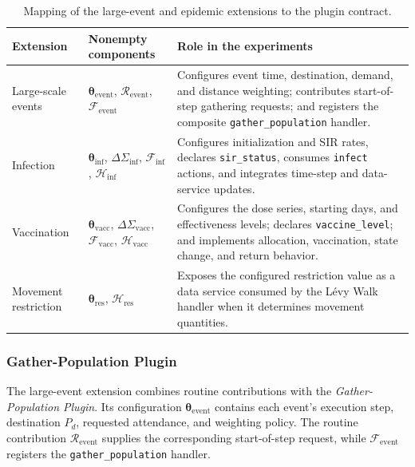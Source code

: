 \begin{table}[ht]
\centering
\footnotesize
\setlength{\tabcolsep}{4pt}
\caption{Mapping of the large-event and epidemic extensions to the plugin contract.}
\label{tbl:large_scale_epidemic_plugin_contract}
\begin{tabularx}{\linewidth}{@{}p{2.5cm}p{4.0cm}X@{}}
\toprule
\textbf{Extension} & \textbf{Nonempty components} & \textbf{Role in the experiments} \\
\midrule
Large-scale events
& $\bm{\theta}_{\mathrm{event}}$, $\mathcal{R}_{\mathrm{event}}$, $\mathcal{F}_{\mathrm{event}}$
& Configures event time, destination, demand, and distance weighting; contributes start-of-step gathering requests; and registers the composite \texttt{gather\_population} handler. \\
Infection
& $\bm{\theta}_{\mathrm{inf}}$, $\Delta\Sigma_{\mathrm{inf}}$, $\mathcal{F}_{\mathrm{inf}}$, $\mathcal{H}_{\mathrm{inf}}$
& Configures initialization and SIR rates, declares \texttt{sir\_status}, consumes \texttt{infect} actions, and integrates time-step and data-service updates. \\
Vaccination
& $\bm{\theta}_{\mathrm{vacc}}$, $\Delta\Sigma_{\mathrm{vacc}}$, $\mathcal{F}_{\mathrm{vacc}}$, $\mathcal{H}_{\mathrm{vacc}}$
& Configures the dose series, starting days, and effectiveness levels; declares \texttt{vaccine\_level}; and implements allocation, vaccination, state change, and return behavior. \\
Movement restriction
& $\bm{\theta}_{\mathrm{res}}$, $\mathcal{H}_{\mathrm{res}}$
& Exposes the configured restriction value as a data service consumed by the L\'evy Walk handler when it determines movement quantities. \\
\bottomrule
\end{tabularx}
\end{table}
\FloatBarrier


\subsubsection{Gather-Population Plugin}

The large-event extension combines routine contributions with the \textit{Gather-Population Plugin}. Its configuration $\bm{\theta}_{\mathrm{event}}$ contains each event's execution step, destination $P_d$, requested attendance, and weighting policy. The routine contribution $\mathcal{R}_{\mathrm{event}}$ supplies the corresponding start-of-step request, while $\mathcal{F}_{\mathrm{event}}$ registers the \texttt{gather\_population} handler.

